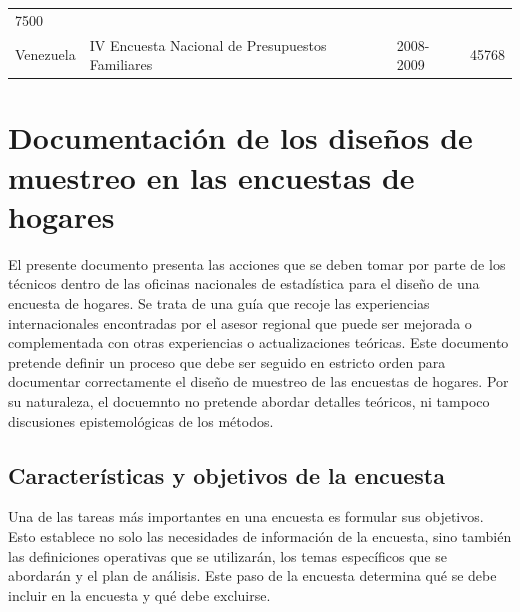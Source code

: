 \begin{longtable}[]{@{}llll@{}}
\begin{minipage}[t]{0.14\columnwidth}
7500\strut
\end{minipage}\tabularnewline
\begin{minipage}[t]{0.17\columnwidth}\raggedright
Venezuela\strut
\end{minipage} & \begin{minipage}[t]{0.50\columnwidth}\raggedright
IV Encuesta Nacional de Presupuestos Familiares\strut
\end{minipage} & \begin{minipage}[t]{0.08\columnwidth}\raggedright
2008-2009\strut
\end{minipage} & \begin{minipage}[t]{0.14\columnwidth}\raggedright
45768\strut
\end{minipage}\tabularnewline
\bottomrule
\end{longtable}

\elandscape

\hypertarget{documentacion-de-los-disenos-de-muestreo-en-las-encuestas-de-hogares}{%
\section*{Documentación de los diseños de muestreo en las encuestas de hogares}\label{documentacion-de-los-disenos-de-muestreo-en-las-encuestas-de-hogares}}


El presente documento presenta las acciones que se deben tomar por parte de los técnicos dentro de las oficinas nacionales de estadística para el diseño de una encuesta de hogares. Se trata de una guía que recoje las experiencias internacionales encontradas por el asesor regional que puede ser mejorada o complementada con otras experiencias o actualizaciones teóricas. Este documento pretende definir un proceso que debe ser seguido en estricto orden para documentar correctamente el diseño de muestreo de las encuestas de hogares. Por su naturaleza, el docuemnto no pretende abordar detalles teóricos, ni tampoco discusiones epistemológicas de los métodos.

\hypertarget{caracteristicas-y-objetivos-de-la-encuesta}{%
\subsection*{Características y objetivos de la encuesta}\label{caracteristicas-y-objetivos-de-la-encuesta}}


Una de las tareas más importantes en una encuesta es formular sus objetivos. Esto establece no solo las necesidades de información de la encuesta, sino también las definiciones operativas que se utilizarán, los temas específicos que se abordarán y el plan de análisis. Este paso de la encuesta determina qué se debe incluir en la encuesta y qué debe excluirse.

